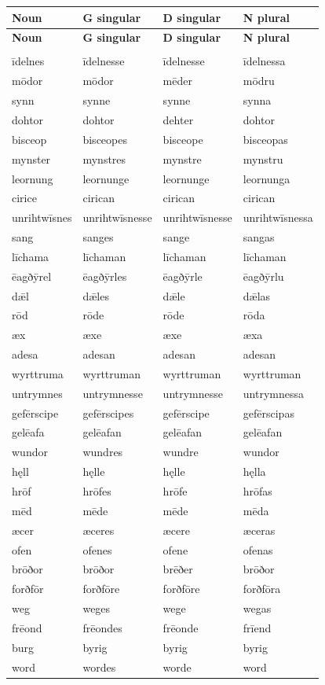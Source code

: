 \begin{longtable}{@{}>{\raggedright\arraybackslash}p{31mm}>{\raggedright\arraybackslash}p{29mm}>{\raggedright\arraybackslash}p{29mm}>{\raggedright\arraybackslash}p{26.56mm}@{}}
\toprule
\textbf{Noun} & \textbf{G singular} & \textbf{D singular} & \textbf{N plural} \\
\midrule
\endfirsthead
\toprule
\textbf{Noun} & \textbf{G singular} & \textbf{D singular} & \textbf{N plural} \\
\midrule
\endhead
\midrule
\multicolumn{4}{r}{\footnotesize Continued on the following page.}\\
\endfoot
\bottomrule
\endlastfoot
īdelnes & īdelnesse & īdelnesse & īdelnessa \\
mōdor & mōdor & mēder & mōdru \\
synn & synne & synne & synna \\
dohtor & dohtor & dehter & dohtor \\
bisceop & bisceopes & bisceope & bisceopas \\
mynster & mynstres & mynstre & mynstru \\
leornung & leornunge & leornunge & leornunga \\
cirice & cirican & cirican & cirican \\
unrihtwīsnes & unrihtwīsnesse & unrihtwīsnesse & unrihtwīsnessa \\
sang & sanges & sange & sangas \\
līchama & līchaman & līchaman & līchaman \\
ēagðȳrel & ēagðȳrles & ēagðȳrle & ēagðȳrlu \\
dǣl & dǣles & dǣle & dǣlas \\
rōd & rōde & rōde & rōda \\
æx & æxe & æxe & æxa \\
adesa & adesan & adesan & adesan \\
wyrttruma & wyrttruman & wyrttruman & wyrttruman \\
untrymnes & untrymnesse & untrymnesse & untrymnessa \\
gefērscipe & gefērscipes & gefērscipe & gefērscipas \\
gelēafa & gelēafan & gelēafan & gelēafan \\
wundor & wundres & wundre & wundor \\
hęll & hęlle & hęlle & hęlla \\
hrōf & hrōfes & hrōfe & hrōfas \\
mēd & mēde & mēde & mēda \\
æcer & æceres & æcere & æceras \\
ofen & ofenes & ofene & ofenas \\
brōðor & brōðor & brēðer & brōðor \\
forðfōr & forðfōre & forðfōre & forðfōra \\
weg & weges & wege & wegas \\
frēond & frēondes & frēonde & frīend \\
burg & byrig & byrig & byrig \\
word & wordes & worde & word \\
\end{longtable}
